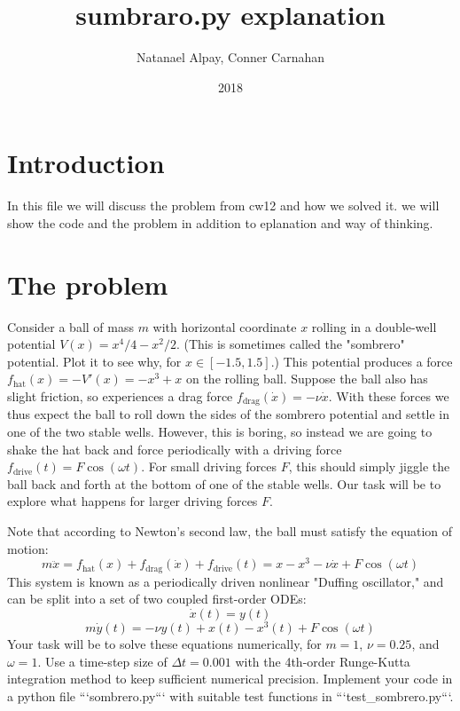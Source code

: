 \documentclass[aps,pra,notitlepage,amsmath,amssymb,letterpaper,12pt]{revtex4-1}
\theoremstyle{definition}
\begin{document}
\title{sumbraro.py explanation }

\author{Natanael Alpay, Conner Carnahan}
\date{2018}
\maketitle

\tableofcontents




\maketitle
\section{Introduction}

In this file we will discuss the problem from cw12 and how we solved it. we will show the code and the problem in addition to eplanation and way of thinking.



\section{The problem} %

Consider a ball of mass $m$ with horizontal coordinate $x$ rolling in a double-well potential $V(x) = x^4/4 - x^2/2$. (This is sometimes called the "sombrero" potential. Plot it to see why, for $x\in[-1.5,1.5]$.) This potential produces a force $f_{\text{hat}}(x) = -V'(x) = -x^3 + x$ on the rolling ball. Suppose the ball also has slight friction, so experiences a drag force $f_{\text{drag}}(\dot{x}) = -\nu \dot{x}$. With these forces we thus expect the ball to roll down the sides of the sombrero potential and settle in one of the two stable wells. However, this is boring, so instead we are going to shake the hat back and force periodically with a driving force $f_{\text{drive}}(t) = F\cos(\omega t)$. For small driving forces $F$, this should simply jiggle the ball back and forth at the bottom of one of the stable wells. Our task will be to explore what happens for larger driving forces $F$.

Note that according to Newton's second law, the ball must satisfy the equation of motion: $$m\ddot{x} = f_{\text{hat}}(x) + f_{\text{drag}}(\dot{x}) + f_{\text{drive}}(t) = x - x^3 - \nu \dot{x} + F\cos(\omega t)$$ 
This system is known as a periodically driven nonlinear "Duffing oscillator," and can be split into a set of two coupled first-order ODEs:
$$\dot{x}(t) = y(t)$$
$$m\dot{y}(t) = -\nu y(t) + x(t) - x^3(t) + F\cos(\omega t)$$
Your task will be to solve these equations numerically, for $m=1$, $\nu = 0.25$, and $\omega = 1$. Use a time-step size of $\Delta t = 0.001$ with the 4th-order Runge-Kutta integration method to keep sufficient numerical precision. Implement your code in a python file ```sombrero.py``` with suitable test functions in ```test_sombrero.py```.
\end{document}
